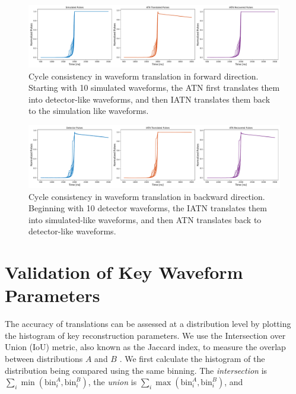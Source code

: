 \begin{figure}%
    \centering
    \includegraphics[width=0.99\linewidth]{ch8/figs/SEP_result_comp_1x3_cycle_BAB.pdf}
    \caption{Cycle consistency in waveform translation in forward direction. Starting with 10 simulated waveforms, the ATN first translates them into detector-like waveforms, and then IATN translates them back to the simulation like waveforms.}
    \label{fig:cycle_bab}
\end{figure}

\begin{figure}%
    \centering
    \includegraphics[width=0.99\linewidth]{ch8/figs/SEP_result_comp_1x3_cycle_ABA.pdf}
    \caption{Cycle consistency in waveform translation in backward direction. Beginning with 10 detector waveforms, the IATN translates them into simulated-like waveforms, and then ATN translates back to detector-like waveforms.}
    \label{fig:cycle_aba}
\end{figure}

\section{Validation of Key Waveform Parameters}
 The accuracy of translations can be assessed at a distribution level by plotting the histogram of key reconstruction parameters. We use the Intersection over Union (IoU) metric, also known as the Jaccard index, to measure the overlap between distributions $A$ and $B$ \cite{murphy1996finley} \cite{jaccard_index}. We first calculate the histogram of the distribution being compared using the same binning. The \textit{intersection} is $\sum_{i} \min(\text{bin}_i^A, \text{bin}_i^B)$, the \textit{union} is $\sum_{i} \max(\text{bin}_i^A, \text{bin}_i^B)$, and
 
